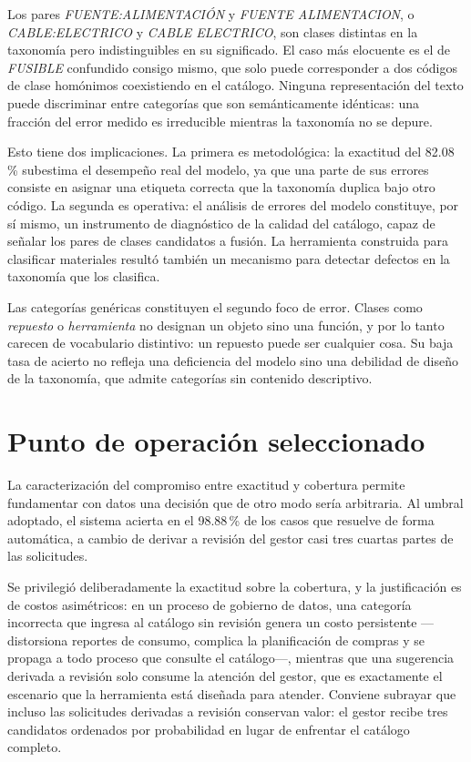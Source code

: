 Los pares \textit{FUENTE:ALIMENTACIÓN} y \textit{FUENTE ALIMENTACION}, o \textit{CABLE:ELECTRICO} y \textit{CABLE ELECTRICO}, son clases distintas en la taxonomía pero indistinguibles en su significado. El caso más elocuente es el de \textit{FUSIBLE} confundido consigo mismo, que solo puede corresponder a dos códigos de clase homónimos coexistiendo en el catálogo. Ninguna representación del texto puede discriminar entre categorías que son semánticamente idénticas: una fracción del error medido es irreducible mientras la taxonomía no se depure.

Esto tiene dos implicaciones. La primera es metodológica: la exactitud del 82.08\,\% subestima el desempeño real del modelo, ya que una parte de sus errores consiste en asignar una etiqueta correcta que la taxonomía duplica bajo otro código. La segunda es operativa: el análisis de errores del modelo constituye, por sí mismo, un instrumento de diagnóstico de la calidad del catálogo, capaz de señalar los pares de clases candidatos a fusión. La herramienta construida para clasificar materiales resultó también un mecanismo para detectar defectos en la taxonomía que los clasifica.

Las categorías genéricas constituyen el segundo foco de error. Clases como \textit{repuesto} o \textit{herramienta} no designan un objeto sino una función, y por lo tanto carecen de vocabulario distintivo: un repuesto puede ser cualquier cosa. Su baja tasa de acierto no refleja una deficiencia del modelo sino una debilidad de diseño de la taxonomía, que admite categorías sin contenido descriptivo.

\section{Punto de operación seleccionado}
La caracterización del compromiso entre exactitud y cobertura permite fundamentar con datos una decisión que de otro modo sería arbitraria. Al umbral adoptado, el sistema acierta en el 98.88\,\% de los casos que resuelve de forma automática, a cambio de derivar a revisión del gestor casi tres cuartas partes de las solicitudes.

Se privilegió deliberadamente la exactitud sobre la cobertura, y la justificación es de costos asimétricos: en un proceso de gobierno de datos, una categoría incorrecta que ingresa al catálogo sin revisión genera un costo persistente —distorsiona reportes de consumo, complica la planificación de compras y se propaga a todo proceso que consulte el catálogo—, mientras que una sugerencia derivada a revisión solo consume la atención del gestor, que es exactamente el escenario que la herramienta está diseñada para atender. Conviene subrayar que incluso las solicitudes derivadas a revisión conservan valor: el gestor recibe tres candidatos ordenados por probabilidad en lugar de enfrentar el catálogo completo.

